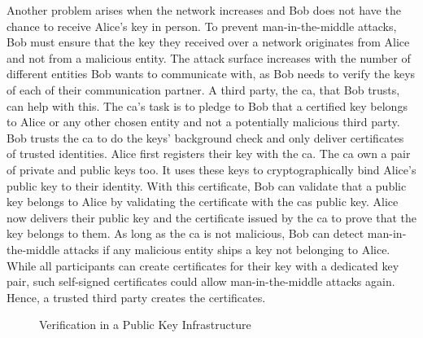 Another problem arises when the network increases and Bob does not have the
chance to receive Alice's key in person. To prevent man-in-the-middle attacks,
Bob must ensure that the key they received over a network originates from Alice
and not from a malicious entity. The attack surface increases with the number of
different entities Bob wants to communicate with, as Bob needs to verify the
keys of each of their communication partner. A third party, the \gls{ca}, that
Bob trusts, can help with this. The \gls{ca}'s task is to pledge to Bob that a
certified key belongs to Alice or any other chosen entity and not a potentially
malicious third party. Bob trusts the \gls{ca} to do the keys' background check
and only deliver certificates of trusted identities. Alice first registers their
key with the \gls{ca}. The \gls{ca} own a pair of private and public keys too.
It uses these keys to cryptographically bind Alice's public key to their
identity. With this certificate, Bob can validate that a public key belongs to
Alice by validating the certificate with the \glspl{ca} public key. Alice now
delivers their public key and the certificate issued by the \gls{ca} to prove
that the key belongs to them. As long as the \gls{ca} is not malicious, Bob can
detect man-in-the-middle attacks if any malicious entity ships a key not
belonging to Alice. While all participants can create certificates for their key
with a dedicated key pair, such self-signed certificates could allow
man-in-the-middle attacks again. Hence, a trusted third party creates the
certificates.\\

\begin{figure}
    \begin{center}
        
        \caption{Verification in a Public Key Infrastructure}
        \label{fig:state:technical:chain_of_trust}
    \end{center}
\end{figure}

